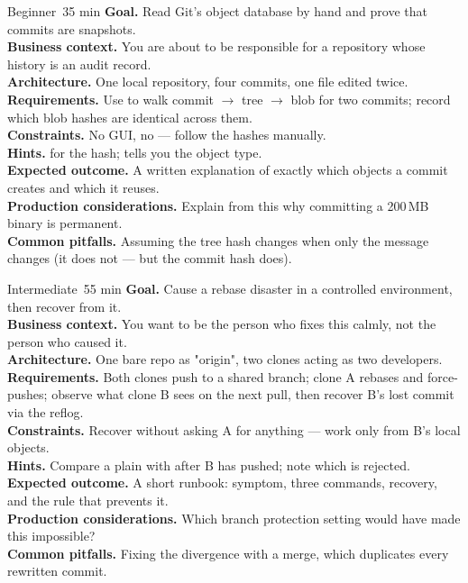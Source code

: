\begin{minilab}{Beginner}{~35 min}
\textbf{Goal.} Read Git's object database by hand and prove that commits are snapshots.\\
\textbf{Business context.} You are about to be responsible for a repository whose history is an audit record.\\
\textbf{Architecture.} One local repository, four commits, one file edited twice.\\
\textbf{Requirements.} Use  to walk commit $\rightarrow$ tree $\rightarrow$ blob for two commits; record which blob hashes are identical across them.\\
\textbf{Constraints.} No GUI, no  --- follow the hashes manually.\\
\textbf{Hints.}  for the hash;  tells you the object type.\\
\textbf{Expected outcome.} A written explanation of exactly which objects a commit creates and which it reuses.\\
\textbf{Production considerations.} Explain from this why committing a 200\,MB binary is permanent.\\
\textbf{Common pitfalls.} Assuming the tree hash changes when only the message changes (it does not --- but the commit hash does).
\end{minilab}

\begin{minilab}{Intermediate}{~55 min}
\textbf{Goal.} Cause a rebase disaster in a controlled environment, then recover from it.\\
\textbf{Business context.} You want to be the person who fixes this calmly, not the person who caused it.\\
\textbf{Architecture.} One bare repo as "origin", two clones acting as two developers.\\
\textbf{Requirements.} Both clones push to a shared branch; clone A rebases and force-pushes; observe what clone B sees on the next pull, then recover B's lost commit via the reflog.\\
\textbf{Constraints.} Recover without asking A for anything --- work only from B's local objects.\\
\textbf{Hints.} Compare a plain  with  after B has pushed; note which is rejected.\\
\textbf{Expected outcome.} A short runbook: symptom, three commands, recovery, and the rule that prevents it.\\
\textbf{Production considerations.} Which branch protection setting would have made this impossible?\\
\textbf{Common pitfalls.} Fixing the divergence with a merge, which duplicates every rewritten commit.
\end{minilab}

